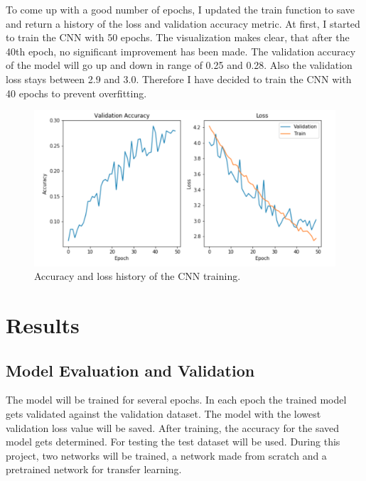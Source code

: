 \documentclass{article}
\begin{document}
To come up with a good number of epochs, I updated the train function to save and return a history of the loss and validation accuracy metric. At first, I started to train the CNN with 50 epochs. The visualization makes clear, that after the 40th epoch, no significant improvement has been made. The validation accuracy of the model will go up and down in range of 0.25 and 0.28. Also the validation loss stays between 2.9 and 3.0. Therefore I have decided to train the CNN with 40 epochs to prevent overfitting.
\begin{figure}[h]
    \centering
    \includegraphics[scale=0.45]{./images/50_epochs}
    \caption{Accuracy and loss history of the CNN training.}
    \label{fig:cnn_train_metrics}
\end{figure}

\section{Results} \label{s_results}

\subsection{Model Evaluation and Validation} \label{su_model_eval_val}
The model will be trained for several epochs. In each epoch the trained model gets validated against the validation dataset. The model with the lowest validation loss value will be saved. After training, the accuracy for the saved model gets determined. For testing the test dataset will be used.\newline
During this project, two networks will be trained, a network made from scratch and a pretrained network for transfer learning.
\end{document}
